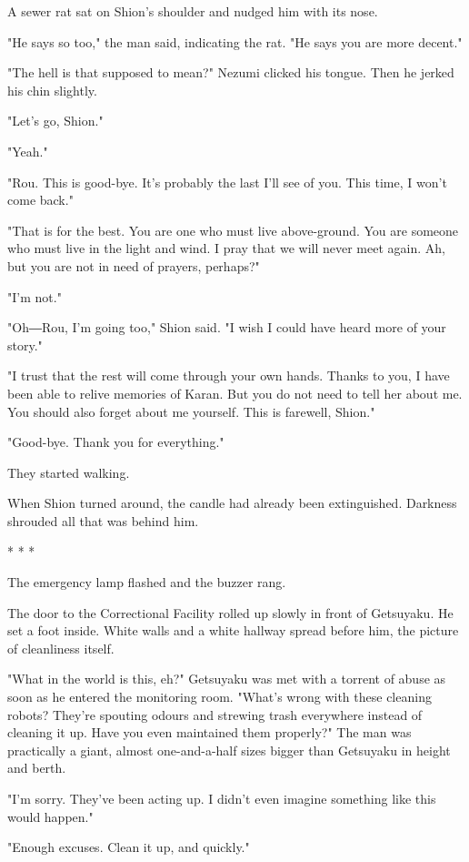 A sewer rat sat on Shion's shoulder and nudged him with its nose.

"He says so too," the man said, indicating the rat. "He says you are
more decent."

"The hell is that supposed to mean?" Nezumi clicked his tongue. Then he
jerked his chin slightly.

"Let's go, Shion."

"Yeah."

"Rou. This is good-bye. It's probably the last I'll see of you. This
time, I won't come back."

"That is for the best. You are one who must live above-ground. You are
someone who must live in the light and wind. I pray that we will never
meet again. Ah, but you are not in need of prayers, perhaps?"

"I'm not."

"Oh―Rou, I'm going too," Shion said. "I wish I could have heard more of
your story."

"I trust that the rest will come through your own hands. Thanks to you,
I have been able to relive memories of Karan. But you do not need to
tell her about me. You should also forget about me yourself. This is
farewell, Shion."

"Good-bye. Thank you for everything."

They started walking.

When Shion turned around, the candle had already been extinguished.
Darkness shrouded all that was behind him.

* * *

The emergency lamp flashed and the buzzer rang.

The door to the Correctional Facility rolled up slowly in front of
Getsuyaku. He set a foot inside. White walls and a white hallway spread
before him, the picture of cleanliness itself.

"What in the world is this, eh?" Getsuyaku was met with a torrent of
abuse as soon as he entered the monitoring room. "What's wrong with
these cleaning robots? They're spouting odours and strewing trash
everywhere instead of cleaning it up. Have you even maintained them
properly?" The man was practically a giant, almost one-and-a-half sizes
bigger than Getsuyaku in height and berth.

"I'm sorry. They've been acting up. I didn't even imagine something like
this would happen."

"Enough excuses. Clean it up, and quickly."

